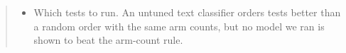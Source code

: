 \documentclass[sigconf,nonacm]{acmart}
\begin{document}
\begin{abstract}
\begin{itemize}
\item Which tests to run. An untuned text classifier orders tests better than a random order with the same arm counts, but no model we ran is shown to beat the arm-count rule.

\end{itemize}
\end{abstract}
\end{document}
